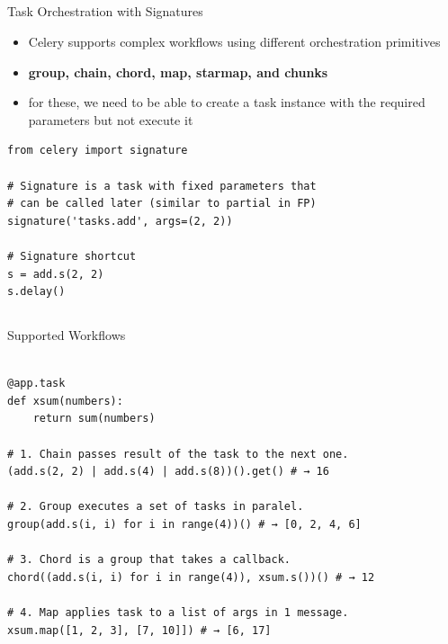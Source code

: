 \documentclass[xcolor=x11names,compress,t]{beamer}
\renewcommand{\(}{\begin{columns}[T]}
\renewcommand{\)}{\end{columns}}
\newcommand{\<}[1]{\begin{column}{#1}}
\renewcommand{\>}{\end{column}}
\begin{document}
\subsection{}
\begin{frame}[fragile]{Task Orchestration with Signatures}
\begin{itemize}
    \item Celery supports complex workflows using different orchestration primitives
    \item \textbf{group, chain, chord, map, starmap, and chunks}
    \item for these, we need to be able to create a task instance with the required parameters but not execute it
\end{itemize}
\begin{verbatim}
from celery import signature

# Signature is a task with fixed parameters that 
# can be called later (similar to partial in FP)
signature('tasks.add', args=(2, 2))

# Signature shortcut
s = add.s(2, 2)
s.delay()
\end{verbatim}
\end{frame} 

\subsection{}
\begin{frame}[fragile]{Supported Workflows}
\begin{verbatim}

@app.task
def xsum(numbers):
    return sum(numbers)

# 1. Chain passes result of the task to the next one.
(add.s(2, 2) | add.s(4) | add.s(8))().get() # → 16

# 2. Group executes a set of tasks in paralel.
group(add.s(i, i) for i in range(4))() # → [0, 2, 4, 6]

# 3. Chord is a group that takes a callback.
chord((add.s(i, i) for i in range(4)), xsum.s())() # → 12

# 4. Map applies task to a list of args in 1 message.
xsum.map([1, 2, 3], [7, 10]]) # → [6, 17]

\end{verbatim}
\end{frame} 
\end{document}
